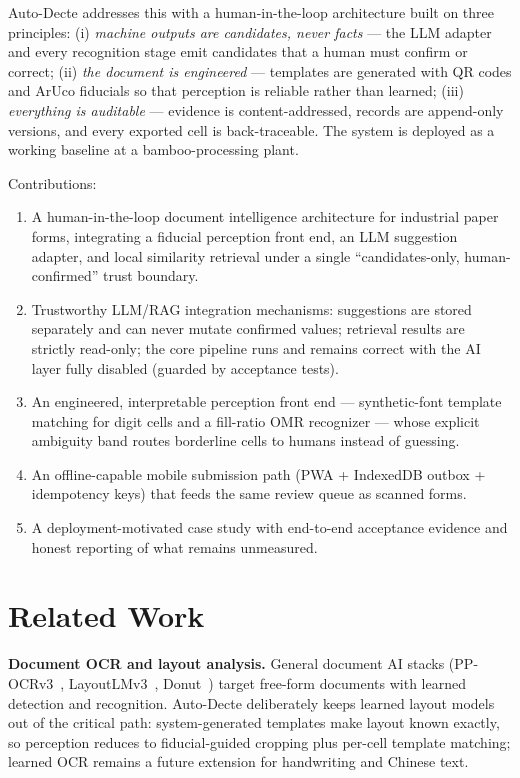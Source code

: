 \documentclass[conference]{IEEEtran}
\begin{document}
Auto-Decte addresses this with a human-in-the-loop architecture built on three principles: (i) \emph{machine outputs are candidates, never facts} --- the LLM adapter and every recognition stage emit candidates that a human must confirm or correct; (ii) \emph{the document is engineered} --- templates are generated with QR codes and ArUco fiducials so that perception is reliable rather than learned; (iii) \emph{everything is auditable} --- evidence is content-addressed, records are append-only versions, and every exported cell is back-traceable. The system is deployed as a working baseline at a bamboo-processing plant.

Contributions:
\begin{enumerate}
\item A human-in-the-loop document intelligence architecture for industrial paper forms, integrating a fiducial perception front end, an LLM suggestion adapter, and local similarity retrieval under a single ``candidates-only, human-confirmed'' trust boundary.
\item Trustworthy LLM/RAG integration mechanisms: suggestions are stored separately and can never mutate confirmed values; retrieval results are strictly read-only; the core pipeline runs and remains correct with the AI layer fully disabled (guarded by acceptance tests).
\item An engineered, interpretable perception front end --- synthetic-font template matching for digit cells and a fill-ratio OMR recognizer --- whose explicit ambiguity band routes borderline cells to humans instead of guessing.
\item An offline-capable mobile submission path (PWA + IndexedDB outbox + idempotency keys) that feeds the same review queue as scanned forms.
\item A deployment-motivated case study with end-to-end acceptance evidence and honest reporting of what remains unmeasured.
\end{enumerate}

\section{Related Work}
\textbf{Document OCR and layout analysis.} General document AI stacks (PP-OCRv3~\cite{ppocrv3}, LayoutLMv3~\cite{layoutlmv3}, Donut~\cite{donut}) target free-form documents with learned detection and recognition. Auto-Decte deliberately keeps learned layout models out of the critical path: system-generated templates make layout known exactly, so perception reduces to fiducial-guided cropping plus per-cell template matching; learned OCR remains a future extension for handwriting and Chinese text.
\end{document}
